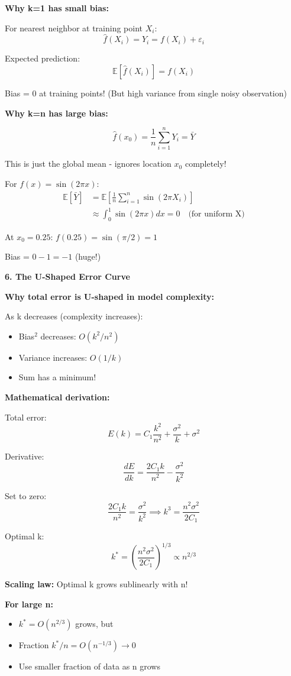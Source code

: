 \documentclass[12pt]{article}
\begin{document}
\begin{explanation}
\textbf{Why k=1 has small bias:}

For nearest neighbor at training point $X_i$:
\[
\hat{f}(X_i) = Y_i = f(X_i) + \varepsilon_i
\]

Expected prediction:
\[
\mathbb{E}[\hat{f}(X_i)] = f(X_i)
\]

Bias = 0 at training points! (But high variance from single noisy observation)

\textbf{Why k=n has large bias:}

\[
\hat{f}(x_0) = \frac{1}{n}\sum_{i=1}^n Y_i = \bar{Y}
\]

This is just the global mean - ignores location $x_0$ completely!

For $f(x) = \sin(2\pi x)$:
\begin{align*}
\mathbb{E}[\bar{Y}] &= \mathbb{E}\left[\frac{1}{n}\sum_{i=1}^n \sin(2\pi X_i)\right] \\
&\approx \int_0^1 \sin(2\pi x)dx = 0 \quad \text{(for uniform X)}
\end{align*}

At $x_0 = 0.25$: $f(0.25) = \sin(\pi/2) = 1$

Bias = $0 - 1 = -1$ (huge!)

\textbf{6. The U-Shaped Error Curve}

\textbf{Why total error is U-shaped in model complexity:}

As k decreases (complexity increases):
\begin{itemize}
    \item Bias$^2$ decreases: $O(k^2/n^2)$
    \item Variance increases: $O(1/k)$
    \item Sum has a minimum!
\end{itemize}

\textbf{Mathematical derivation:}

Total error:
\[
E(k) = C_1\frac{k^2}{n^2} + \frac{\sigma^2}{k} + \sigma^2
\]

Derivative:
\[
\frac{dE}{dk} = \frac{2C_1k}{n^2} - \frac{\sigma^2}{k^2}
\]

Set to zero:
\[
\frac{2C_1k}{n^2} = \frac{\sigma^2}{k^2} \implies k^3 = \frac{n^2\sigma^2}{2C_1}
\]

Optimal k:
\[
k^* = \left(\frac{n^2\sigma^2}{2C_1}\right)^{1/3} \propto n^{2/3}
\]

\textbf{Scaling law:} Optimal k grows sublinearly with n!

\textbf{For large n:}
\begin{itemize}
    \item $k^* = O(n^{2/3})$ grows, but
    \item Fraction $k^*/n = O(n^{-1/3}) \to 0$
    \item Use smaller fraction of data as n grows
\end{itemize}


\end{explanation}
\end{document}
